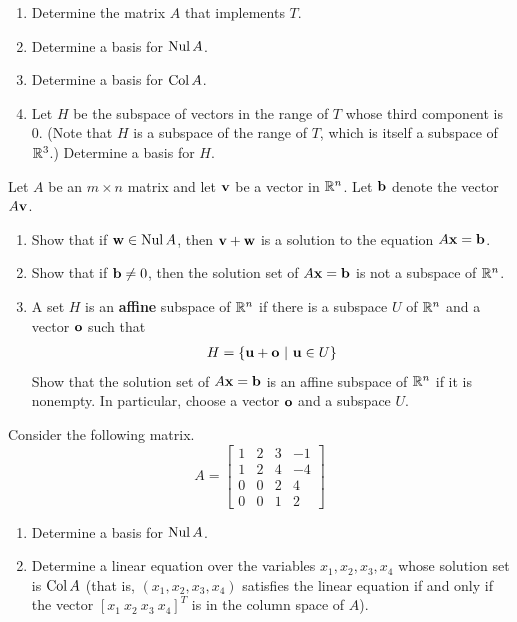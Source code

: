 \begin{tasks}[resume, style=enumerate]
\begin{enumerate}[label=(\alph*)]
  \item
    Determine the matrix $A$ that implements $T$.
  \item
    Determine a basis for $\operatorname{\mathrm{Nul}} A$.
  \item
    Determine a basis for $\operatorname{\mathrm{Col}} A$.
  \item
    Let $H$ be the subspace of vectors in the range of $T$ whose third
    component is $0$.  (Note that $H$ is a subspace of the range of
    $T$, which is itself a subspace of $\mathbb R^3$.)  Determine a basis for
    $H$.
  \end{enumerate}
\task
  Let $A$ be an $m \times n$ matrix and let $\mathbf v$ be a vector in
  $\mathbb R^n$.  Let $\mathbf b$ denote the vector $A\mathbf v$.
  \begin{enumerate}[label=(\alph*)]
  \item
    Show that if $\mathbf w \in \operatorname{\mathrm{Nul}} A$, then $\mathbf v + \mathbf w$ is a solution to
    the equation $A\mathbf x = \mathbf b$.
  \item
    Show that if $\mathbf b \not = 0$, then the solution set of $A\mathbf x = \mathbf b$
    is not a subspace of $\mathbb R^n$.
  \item
    A set $H$ is an \textbf{affine} subspace of $\mathbb R^n$ if there is a
    subspace $U$ of $\mathbb R^n$ and a vector $\mathbf o$ such that
    \begin{align*}
      H = \{\mathbf u + \mathbf o \ | \ \mathbf u \in U\}
    \end{align*}
    Show that the solution set of $A\mathbf x = \mathbf b$ is an affine subspace
    of $\mathbb R^n$ if it is nonempty.  In particular, choose a vector $\mathbf o$
    and a subspace $U$.
  \end{enumerate}
\task
  Consider the following matrix.
  \begin{displaymath}
    A =
    \begin{bmatrix}
      1 & 2 & 3 & -1 \\
      1 & 2 & 4 & -4 \\
      0 & 0 & 2 & 4 \\
      0 & 0 & 1 & 2
    \end{bmatrix}
  \end{displaymath}
  \begin{enumerate}[label=(\alph*)]
  \item
    Determine a basis for $\operatorname{\mathrm{Nul}} A$.
  \item
    Determine a linear equation over the variables $x_1, x_2, x_3,
    x_4$ whose solution set is $\operatorname{\mathrm{Col}} A$ (that is, $(x_1, x_2, x_3,
    x_4)$ satisfies the linear equation if and only if the vector
    $[x_1 \ x_2 \ x_3 \ x_4]^T$ is in the column space of $A$).

\end{enumerate}
\end{tasks}
